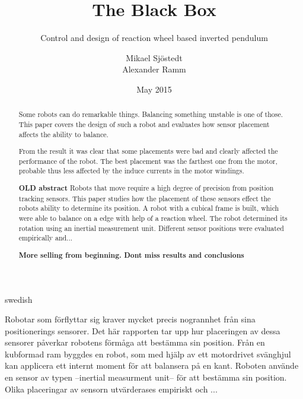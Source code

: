 \documentclass[a4paper,11pt]{kth-mag}
\title{The Black Box}
\subtitle{Control and design of reaction wheel based inverted pendulum}
\author{Mikael Sjöstedt \\ Alexander Ramm}
\date{May 2015}
\begin{document}

\clearpage

\frontmatter
\pagestyle{plain}
{}
\maketitle
{}
\begin{abstract}
Some robots can do remarkable things. Balancing something unstable is one of those. This paper covers the design of such a robot and evaluates how sensor placement affects the ability to balance.

From the result it was clear that some placements were bad and clearly affected the performance of the robot. The best placement was the farthest one from the motor, probable thus less affected by the induce currents in the motor windings.

\textbf{OLD abstract}
Robots that move require a high degree of precision from position tracking sensors. This paper studies how the 
placement of these sensors effect the robots ability to determine its position. A robot with a cubical frame is
built, which were able to balance on a edge with help of a reaction wheel. The robot determined its rotation using an inertial measurement unit. Different sensor positions were evaluated empirically and...

\textbf{More selling from beginning. Dont miss results and conclusions}
 
\end{abstract}
\cleardoublepage
\begin{foreignabstract}{swedish}
Robotar som förflyttar sig kraver mycket precis nogrannhet från sina positionerings sensorer. Det här rapporten tar
upp hur placeringen av dessa sensorer påverkar robotens förmåga att bestämma sin position. Från en kubformad ram 
byggdes en robot, som med hjälp av ett motordrivet svänghjul kan applicera ett internt moment för att balansera på en kant. Roboten använde en sensor av typen --inertial measurment unit-- för att bestämma sin position. Olika placeringar av sensorn utvärderases empiriskt och ...
\\


\end{foreignabstract}
\clearpage
\end{document}
